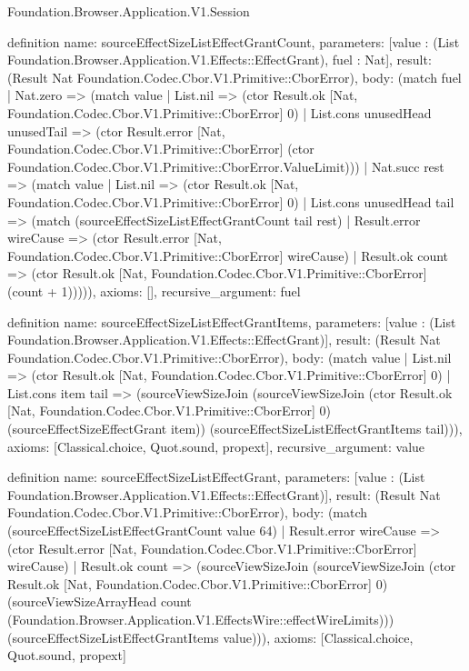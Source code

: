 \begin{lexlean}{Foundation.Browser.Application.V1.Session}
\begin{semanticmodule}
definition{
  name: sourceEffectSizeListEffectGrantCount,
  parameters: [value : (List Foundation.Browser.Application.V1.Effects::EffectGrant), fuel : Nat],
  result: (Result Nat Foundation.Codec.Cbor.V1.Primitive::CborError),
  body: (match fuel
    | Nat.zero => (match value
      | List.nil => (ctor Result.ok [Nat, Foundation.Codec.Cbor.V1.Primitive::CborError] 0)
      | List.cons unusedHead unusedTail => (ctor Result.error [Nat, Foundation.Codec.Cbor.V1.Primitive::CborError] (ctor Foundation.Codec.Cbor.V1.Primitive::CborError.ValueLimit)))
    | Nat.succ rest => (match value
      | List.nil => (ctor Result.ok [Nat, Foundation.Codec.Cbor.V1.Primitive::CborError] 0)
      | List.cons unusedHead tail => (match (sourceEffectSizeListEffectGrantCount tail rest)
        | Result.error wireCause => (ctor Result.error [Nat, Foundation.Codec.Cbor.V1.Primitive::CborError] wireCause)
        | Result.ok count => (ctor Result.ok [Nat, Foundation.Codec.Cbor.V1.Primitive::CborError] (count + 1))))),
  axioms: [],
  recursive_argument: fuel
}

definition{
  name: sourceEffectSizeListEffectGrantItems,
  parameters: [value : (List Foundation.Browser.Application.V1.Effects::EffectGrant)],
  result: (Result Nat Foundation.Codec.Cbor.V1.Primitive::CborError),
  body: (match value
    | List.nil => (ctor Result.ok [Nat, Foundation.Codec.Cbor.V1.Primitive::CborError] 0)
    | List.cons item tail => (sourceViewSizeJoin (sourceViewSizeJoin (ctor Result.ok [Nat, Foundation.Codec.Cbor.V1.Primitive::CborError] 0) (sourceEffectSizeEffectGrant item)) (sourceEffectSizeListEffectGrantItems tail))),
  axioms: [Classical.choice, Quot.sound, propext],
  recursive_argument: value
}

definition{
  name: sourceEffectSizeListEffectGrant,
  parameters: [value : (List Foundation.Browser.Application.V1.Effects::EffectGrant)],
  result: (Result Nat Foundation.Codec.Cbor.V1.Primitive::CborError),
  body: (match (sourceEffectSizeListEffectGrantCount value 64)
    | Result.error wireCause => (ctor Result.error [Nat, Foundation.Codec.Cbor.V1.Primitive::CborError] wireCause)
    | Result.ok count => (sourceViewSizeJoin (sourceViewSizeJoin (ctor Result.ok [Nat, Foundation.Codec.Cbor.V1.Primitive::CborError] 0) (sourceViewSizeArrayHead count (Foundation.Browser.Application.V1.EffectsWire::effectWireLimits))) (sourceEffectSizeListEffectGrantItems value))),
  axioms: [Classical.choice, Quot.sound, propext]
}


\end{semanticmodule}
\end{lexlean}
